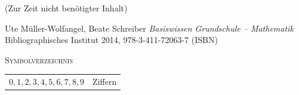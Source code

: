 \documentclass[a4paper]{amsart}
\theoremstyle{definition}
\begin{document}
\begin{backup}
   (Zur Zeit nicht benötigter Inhalt)
\end{backup}

\begin{thebibliography}{9}
      Ute Müller-Wolfangel, Beate Schreiber \emph{Basiswissen Grundschule – Mathematik}
      Bibliographisches Institut 2014, 978-3-411-72063-7 (ISBN)
      
\end{thebibliography}

\begin{large}
    \centerline{\textsc{Symbolverzeichnis}}
\end{large}
\bigskip

\renewcommand*{\arraystretch}{1}

\begin{tabular}{ll}
    $0,1,2,3,4,5,6,7,8,9$          & Ziffern\\
\end{tabular}
\end{document}
